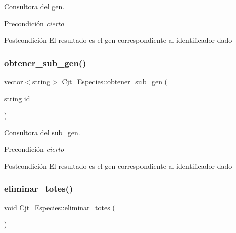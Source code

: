 Consultora del gen. 

\begin{DoxyPrecond}{Precondición}
{\itshape cierto} 
\end{DoxyPrecond}
\begin{DoxyPostcond}{Postcondición}
El resultado es el gen correspondiente al identificador dado 
\end{DoxyPostcond}
\mbox{\label{class_cjt___especies_a8b79c4a271c4d5e4f6c3aa1b8b69b9ec}} 
\subsubsection{\texorpdfstring{obtener\+\_\+sub\+\_\+gen()}{obtener\_sub\_gen()}}
{\footnotesize\ttfamily vector$<$string$>$ Cjt\+\_\+\+Especies\+::obtener\+\_\+sub\+\_\+gen (\begin{DoxyParamCaption}\item[{string}]{id }\end{DoxyParamCaption})}



Consultora del sub\+\_\+gen. 

\begin{DoxyPrecond}{Precondición}
{\itshape cierto} 
\end{DoxyPrecond}
\begin{DoxyPostcond}{Postcondición}
El resultado es el gen correspondiente al identificador dado 
\end{DoxyPostcond}
\mbox{\label{class_cjt___especies_a341dfedcac85d19e084d68f7611af8f9}} 
\subsubsection{\texorpdfstring{eliminar\+\_\+totes()}{eliminar\_totes()}}
{\footnotesize\ttfamily void Cjt\+\_\+\+Especies\+::eliminar\+\_\+totes (\begin{DoxyParamCaption}{ }\end{DoxyParamCaption})}



